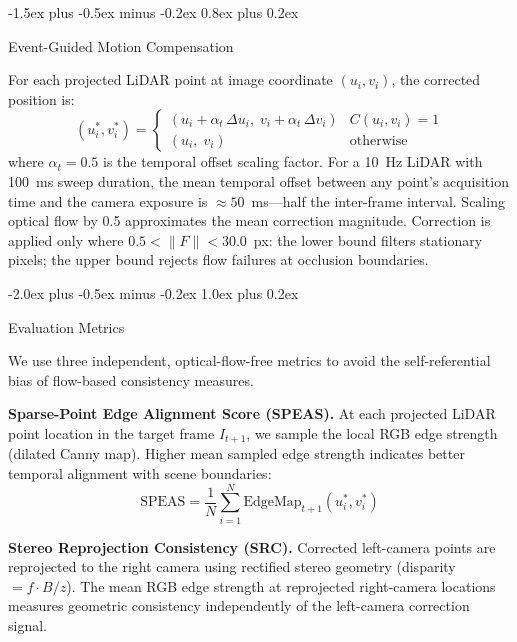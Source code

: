 \documentclass[conference]{IEEEtran}
\makeatletter
\def\section{\@startsection{section}{1}{\z@}
  {-2.0ex plus -0.5ex minus -0.2ex}
  {1.0ex plus 0.2ex}
  {\normalfont\large\bfseries\raggedright}}
\def\subsection{\@startsection{subsection}{2}{\z@}
  {-1.5ex plus -0.5ex minus -0.2ex}
  {0.8ex plus 0.2ex}
  {\normalfont\normalsize\bfseries\raggedright}}
\makeatother
\begin{document}
\subsection{Event-Guided Motion Compensation}

For each projected LiDAR point at image coordinate $(u_i, v_i)$,
the corrected position is:
\begin{equation}
  (u_i^*, v_i^*) =
  \begin{cases}
    (u_i + \alpha_t\,\Delta u_i,\;
     v_i + \alpha_t\,\Delta v_i) & C(u_i,v_i) = 1 \\[4pt]
    (u_i,\; v_i) & \text{otherwise}
  \end{cases}
\end{equation}
where $\alpha_t {=} 0.5$ is the temporal offset scaling factor.
For a 10~Hz LiDAR with 100~ms sweep duration, the mean temporal
offset between any point's acquisition time and the camera
exposure is ${\approx}50$~ms---half the inter-frame interval.
Scaling optical flow by 0.5 approximates the mean correction
magnitude. Correction is applied only where
$0.5 {<} \|F\| {<} 30.0$~px: the lower bound filters stationary
pixels; the upper bound rejects flow failures at occlusion
boundaries.

\section{Evaluation Metrics}

We use three independent, optical-flow-free metrics to avoid
the self-referential bias of flow-based consistency measures.

\textbf{Sparse-Point Edge Alignment Score (SPEAS).}
At each projected LiDAR point location in the target frame
$I_{t+1}$, we sample the local RGB edge strength (dilated Canny
map). Higher mean sampled edge strength indicates better temporal
alignment with scene boundaries:
\begin{equation}
  \text{SPEAS} = \frac{1}{N}\sum_{i=1}^{N}
    \text{EdgeMap}_{t+1}(u_i^*, v_i^*)
\end{equation}

\textbf{Stereo Reprojection Consistency (SRC).}
Corrected left-camera points are reprojected to the right camera
using rectified stereo geometry (disparity $= f \cdot B / z$).
The mean RGB edge strength at reprojected right-camera locations
measures geometric consistency independently of the left-camera
correction signal.
\end{document}

